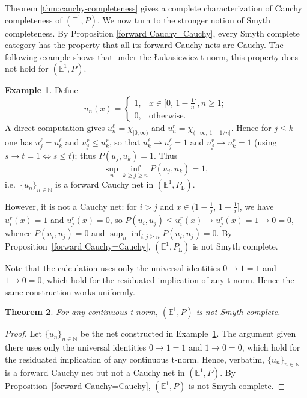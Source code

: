 \documentclass[preprint,3p,times]{elsarticle}
\theoremstyle{plain}
\newtheorem{thm}{Theorem}[section]
\theoremstyle{definition}
\newtheorem{exmp}[thm]{Example}
\newcommand{\Luk}{\mathrm{L}}
\numberwithin{equation}{section}
\begin{document}
Theorem \ref{thm:cauchy-completeness} gives a complete characterization of Cauchy completeness of \((\mathbb{E}^1,P)\). We now turn to the stronger notion of Smyth completeness. By Proposition \ref{forward Cauchy=Cauchy}, every Smyth complete category has the property that all its forward Cauchy nets are Cauchy. The following example shows that under the {\L}ukasiewicz t-norm, this property does not hold for \((\mathbb{E}^1,P)\).
\begin{exmp}\label{ex: not smyth complete}
Define
\[
u_n(x) =
\begin{cases}
	1, & x \in \bigl[0,\,1-\tfrac1n\bigr], n\ge 1; \\
	0, & \text{otherwise}.
\end{cases}
\]
A direct computation gives \(u_n^\ell=\chi_{[0,\infty)}\) and \(u_n^r=\chi_{(-\infty,\,1-1/n]}\). Hence for \(j\le k\) one has \(u_j^\ell=u_k^\ell\) and \(u_j^r\le u_k^r\), so that \(u_k^\ell\to u_j^\ell=1\) and \(u_j^r\to u_k^r=1\) (using \(s\to t=1\iff s\le t\)); thus \(P(u_j,u_k)=1\).
Thus
\[
\sup_n\inf_{k\ge j\ge n}P(u_j,u_k)=1,
\]
i.e.\ \(\{u_n\}_{n\in\mathbb{N}}\) is a forward Cauchy net in \((\mathbb{E}^1,P_{\Luk})\).

However, it is not a Cauchy net: for \(i>j\) and \(x\in\bigl(1-\tfrac1j,\,1-\tfrac1i\bigr]\), we have \(u_i^r(x)=1\) and \(u_j^r(x)=0\), so \(P(u_i,u_j)\le u_i^r(x)\to u_j^r(x)=1\to0=0\), whence \(P(u_i,u_j)=0\) and \(\sup_n\inf_{i,j\ge n}P(u_i,u_j)=0\). By Proposition~\ref{forward Cauchy=Cauchy}, \((\mathbb{E}^1,P_{\Luk})\) is not Smyth complete.
\end{exmp}



Note that the calculation uses only the universal identities 
\(0 \to 1 = 1\) and \(1 \to 0 = 0\), which hold for the residuated implication of any t-norm. Hence the same construction works uniformly.
\begin{thm}
    For any continuous t-norm,  \((\mathbb{E}^1,P)\) is not Smyth complete.
\end{thm}
\begin{proof}
Let \(\{u_n\}_{n\in\mathbb{N}}\) be the net constructed in Example~\ref{ex: not smyth complete}. The argument given there uses only the universal identities \(0\to 1=1\) and \(1\to 0=0\), which hold for the residuated implication of any continuous t-norm. Hence, verbatim, \(\{u_n\}_{n\in\mathbb{N}}\) is a forward Cauchy net but not a Cauchy net in \((\mathbb{E}^1,P)\). By Proposition~\ref{forward Cauchy=Cauchy}, \((\mathbb{E}^1,P)\) is not Smyth complete.
\end{proof}
\end{document}
